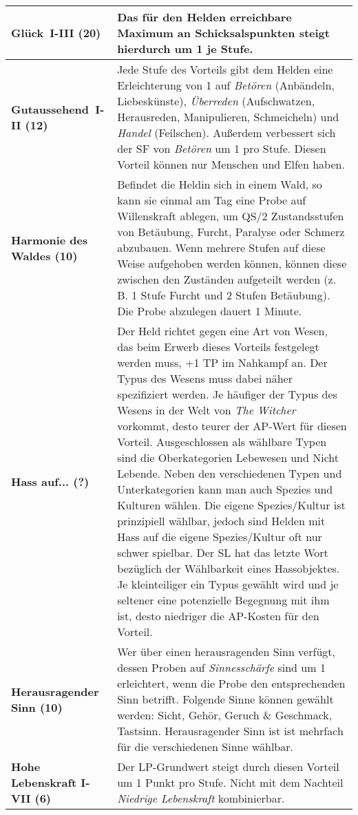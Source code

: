\begin{longtable}{|p{5cm}|p{11cm}|}
\textbf{Glück~I-III (20)} & Das für den Helden erreichbare Maximum an Schicksalspunkten steigt hierdurch um 1 je Stufe. \\ \hline

\textbf{Gutaussehend~I-II (12)} & Jede Stufe des Vorteils gibt dem Helden eine Erleichterung von 1 auf \textit{Betören} (Anbändeln, Liebeskünste), \textit{Überreden} (Aufschwatzen, Herausreden, Manipulieren, Schmeicheln) und \textit{Handel} (Feilschen). Außerdem verbessert sich der SF von \textit{Betören} um 1 pro Stufe. Diesen Vorteil können nur Menschen und Elfen haben. \\ \hline

\textbf{Harmonie des Waldes (10)} & Befindet die Heldin sich in einem Wald, so kann sie einmal am Tag eine Probe auf Willenskraft ablegen, um QS/2 Zustandsstufen von Betäubung, Furcht, Paralyse oder Schmerz abzubauen. Wenn mehrere Stufen auf diese Weise aufgehoben werden können, können diese zwischen den Zuständen aufgeteilt werden (z. B. 1 Stufe Furcht und 2 Stufen Betäubung). Die Probe abzulegen dauert 1 Minute. \\ \hline

\textbf{Hass auf... (?)} & Der Held richtet gegen eine Art von Wesen, das beim Erwerb dieses Vorteils festgelegt werden muss, +1 TP im Nahkampf an. Der Typus des Wesens muss dabei näher spezifiziert werden. Je häufiger der Typus des Wesens in der Welt von \textit{The Witcher} vorkommt, desto teurer der AP-Wert für diesen Vorteil. Ausgeschlossen als wählbare Typen sind die Oberkategorien Lebewesen und Nicht Lebende. Neben den verschiedenen Typen und Unterkategorien kann man auch Spezies und Kulturen wählen. Die eigene Spezies/Kultur ist prinzipiell wählbar, jedoch sind Helden mit Hass auf die eigene Spezies/Kultur oft nur schwer spielbar. Der SL hat das letzte Wort bezüglich der Wählbarkeit eines Hassobjektes. Je kleinteiliger ein Typus gewählt wird und je seltener eine potenzielle Begegnung mit ihm ist, desto niedriger die AP-Kosten für den Vorteil. \\ \hline

\textbf{Herausragender Sinn (10)} & Wer über einen herausragenden Sinn verfügt, dessen Proben auf \textit{Sinnesschärfe} sind um 1 erleichtert, wenn die Probe den entsprechenden Sinn betrifft. Folgende Sinne können gewählt werden: Sicht, Gehör, Geruch \& Geschmack, Tastsinn. Herausragender Sinn ist ist mehrfach für die verschiedenen Sinne wählbar. \\ \hline

\textbf{Hohe Lebenskraft I-VII (6)} & Der LP-Grundwert steigt durch diesen Vorteil um 1 Punkt pro Stufe. Nicht mit dem Nachteil \textit{Niedrige Lebenskraft} kombinierbar. \\ \hline


\end{longtable}
